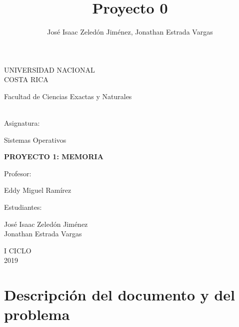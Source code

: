 \documentclass[10pt,a4paper]{article}
\author{José Isaac Zeledón Jiménez, Jonathan Estrada Vargas}
\title{Proyecto 0}
\begin{document}
\begin{titlepage}
\begin{center}
\begin{large}
UNIVERSIDAD NACIONAL\\
COSTA RICA \\
\end{large}
\vspace*{1cm}
\begin{large}
Facultad de Ciencias Exactas y Naturales
\end{large} 
\vspace*{1.8cm}\\
Asignatura:\\
\vspace*{2mm}
\begin{large}
Sistemas Operativos\\
\end{large}
\vspace*{12mm}
\begin{large}
\textbf{PROYECTO 1: 
MEMORIA
}\\
\end{large}
\vspace*{1.8cm}
Profesor:\\
\vspace*{5mm}
\begin{large}
Eddy Miguel Ramírez\\
\end{large}
\vspace*{1.8cm}
Estudiantes: \\
\vspace*{5mm}
\begin{large}
José Isaac Zeledón Jiménez\\
Jonathan Estrada Vargas\\
\end{large}
\vspace*{1.8cm}
I CICLO\\
\vspace*{1.8cm}
2019
\end{center}
\end{titlepage}
\tableofcontents
\pagebreak
\section{Descripción del documento y del problema}
\end{document}
